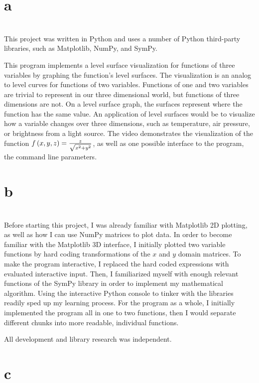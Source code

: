 \documentclass[11pt]{article}
\begin{document}
\selectfont
\section{a}\\
This project was written in Python and uses a number of Python third-party libraries, such as Matplotlib, NumPy, and
SymPy.\double

This program implements a level surface visualization for functions of three variables by graphing the function's level
surfaces. The visualization is an analog to level curves for functions of two variables. Functions of one and two variables
are trivial to represent in our three dimensional world, but functions of three dimensions are not. On a level surface graph,
the surfaces represent where the function has the same value. An application of level surfaces would be to visualize how a
variable changes over three dimensions, such as temperature, air pressure, or brightness from a light source.\double
The video demonstrates the visualization of the function $f\left({x,y,z}\right)=\frac{z}{\sqrt{x^2+y^2}}$, as well as one possible interface
to the program, the command line parameters.\double

\section{b}\\
Before starting this project, I was already familiar with Matplotlib 2D plotting, as well as how I can use NumPy matrices to
plot data. In order to become familiar with the Matplotlib 3D interface, I initially plotted two variable functions by hard
coding transformations of the $x$ and $y$ domain matrices. To make the program interactive, I replaced the hard coded
expressions with evaluated interactive input. Then, I familiarized myself with enough relevant functions of the SymPy library
in order to implement my mathematical algorithm. Using the interactive Python console to tinker with the libraries readily
sped up my learning process. For the program as a whole, I initially implemented the program all in one to two functions,
then I would separate different chunks into more readable, individual functions.\double

All development and library research was independent.\double

\section{c}

\end{document}
